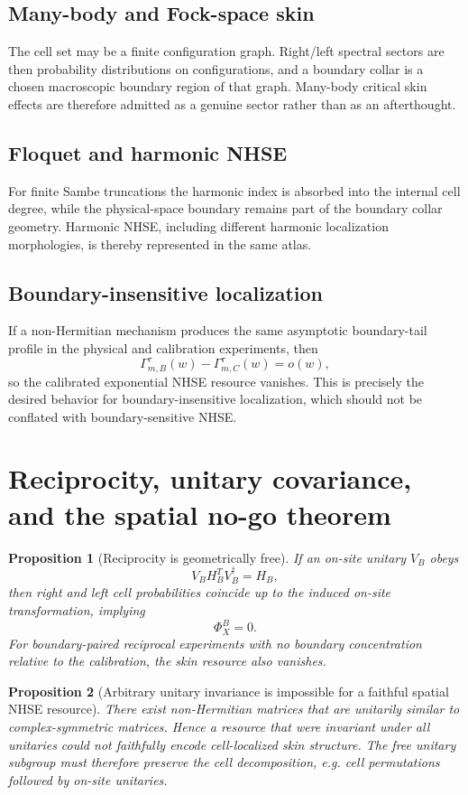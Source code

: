 \documentclass[11pt]{article}
\newtheorem{proposition}{Proposition}
\begin{document}
\subsection{Many-body and Fock-space skin}
The cell set may be a finite configuration graph. Right/left spectral sectors are then probability distributions on configurations, and a boundary collar is a chosen macroscopic boundary region of that graph. Many-body critical skin effects are therefore admitted as a genuine sector rather than as an afterthought. \cite{ManyBodyCritical}

\subsection{Floquet and harmonic NHSE}
For finite Sambe truncations the harmonic index is absorbed into the internal cell degree, while the physical-space boundary remains part of the boundary collar geometry. Harmonic NHSE, including different harmonic localization morphologies, is thereby represented in the same atlas. \cite{HarmonicNHSE}

\subsection{Boundary-insensitive localization}
If a non-Hermitian mechanism produces the same asymptotic boundary-tail profile in the physical and calibration experiments, then
\[
\Gamma_{m,B}^{\tau}(w)-\Gamma_{m,C}^{\tau}(w)=o(w),
\]
so the calibrated exponential NHSE resource vanishes. This is precisely the desired behavior for boundary-insensitive localization, which should not be conflated with boundary-sensitive NHSE. \cite{UnifiedLocalization}

\section{Reciprocity, unitary covariance, and the spatial no-go theorem}

\begin{proposition}[Reciprocity is geometrically free]
If an on-site unitary $V_B$ obeys
\[
V_B H_B^T V_B^\dagger=H_B,
\]
then right and left cell probabilities coincide up to the induced on-site transformation, implying
\[
\Phi_X^B=0.
\]
For boundary-paired reciprocal experiments with no boundary concentration relative to the calibration, the skin resource also vanishes.
\end{proposition}

\begin{proposition}[Arbitrary unitary invariance is impossible for a faithful spatial NHSE resource]
There exist non-Hermitian matrices that are unitarily similar to complex-symmetric matrices. Hence a resource that were invariant under all unitaries could not faithfully encode cell-localized skin structure. The free unitary subgroup must therefore preserve the cell decomposition, e.g. cell permutations followed by on-site unitaries.
\end{proposition}
\end{document}

